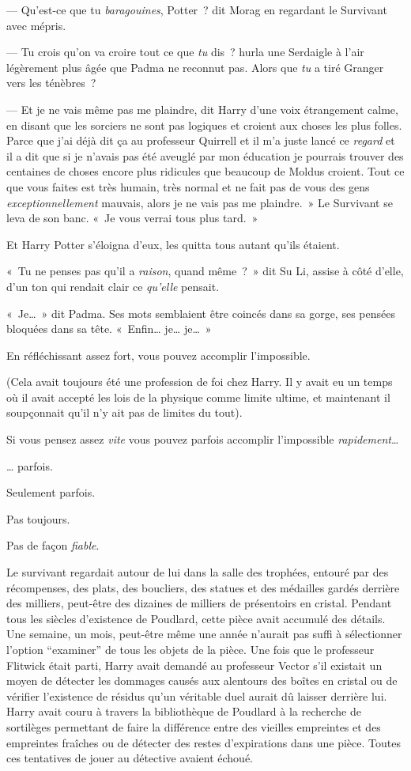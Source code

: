 --- Qu'est-ce que tu \emph{baragouines}, Potter~? dit Morag en regardant le Survivant avec mépris.

--- Tu crois qu'on va croire tout ce que \emph{tu} dis~? hurla une Serdaigle à l'air légèrement plus âgée que Padma ne reconnut pas. Alors que \emph{tu} a tiré Granger vers les ténèbres~?

--- Et je ne vais même pas me plaindre, dit Harry d'une voix étrangement calme, en disant que les sorciers ne sont pas logiques et croient aux choses les plus folles. Parce que j'ai déjà dit ça au professeur Quirrell et il m'a juste lancé ce \emph{regard} et il a dit que si je n'avais pas été aveuglé par mon éducation je pourrais trouver des centaines de choses encore plus ridicules que beaucoup de Moldus croient. Tout ce que vous faites est très humain, très normal et ne fait pas de vous des gens \emph{exceptionnellement} mauvais, alors je ne vais pas me plaindre.~» Le Survivant se leva de son banc. «~Je vous verrai tous plus tard.~»

Et Harry Potter s'éloigna d'eux, les quitta tous autant qu'ils étaient.

«~Tu ne penses pas qu'il a \emph{raison}, quand même~?~» dit Su Li, assise à côté d'elle, d'un ton qui rendait clair ce \emph{qu'elle} pensait.

«~Je…~» dit Padma. Ses mots semblaient être coincés dans sa gorge, ses pensées bloquées dans sa tête. «~Enfin… je… je…~»

\later

En réfléchissant assez fort, vous pouvez accomplir l'impossible.

(Cela avait toujours été une profession de foi chez Harry. Il y avait eu un temps où il avait accepté les lois de la physique comme limite ultime, et maintenant il soupçonnait qu'il n'y ait pas de limites du tout).

Si vous pensez assez \emph{vite} vous pouvez parfois accomplir l'impossible \emph{rapidement}…

… parfois.

Seulement parfois.

Pas toujours.

Pas de façon \emph{fiable}.

Le survivant regardait autour de lui dans la salle des trophées, entouré par des récompenses, des plats, des boucliers, des statues et des médailles gardés derrière des milliers, peut-être des dizaines de milliers de présentoirs en cristal. Pendant tous les siècles d'existence de Poudlard, cette pièce avait accumulé des détails. Une semaine, un mois, peut-être même une année n'aurait pas suffi à sélectionner l'option “examiner” de tous les objets de la pièce. Une fois que le professeur Flitwick était parti, Harry avait demandé au professeur Vector s'il existait un moyen de détecter les dommages causés aux alentours des boîtes en cristal ou de vérifier l'existence de résidus qu'un véritable duel aurait dû laisser derrière lui. Harry avait couru à travers la bibliothèque de Poudlard à la recherche de sortilèges permettant de faire la différence entre des vieilles empreintes et des empreintes fraîches ou de détecter des restes d'expirations dans une pièce. Toutes ces tentatives de jouer au détective avaient échoué.

